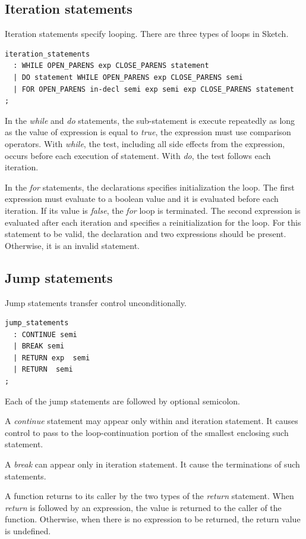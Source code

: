 \documentclass{l3proj}
\begin{document}
\subsection{Iteration statements}
Iteration statements specify looping. There are three types of loops in Sketch. 
\begin{lstlisting}
iteration_statements  
  : WHILE OPEN_PARENS exp CLOSE_PARENS statement
  | DO statement WHILE OPEN_PARENS exp CLOSE_PARENS semi
  | FOR OPEN_PARENS in-decl semi exp semi exp CLOSE_PARENS statement
;
\end{lstlisting}
In the \textit{while} and \textit{do} statements, the sub-statement is execute repeatedly as long as the value of expression is equal to \textit{true}, the expression must use comparison operators. With \textit{while}, the test, including all side effects from the expression, occurs before each execution of statement. With \textit{do}, the test follows each iteration. 

In the \textit{for} statements, the declarations specifies initialization the loop. The first expression must evaluate to a boolean value and it is evaluated before each iteration. If its value is \textit{false}, the \textit{for} loop is terminated. The second expression is evaluated after each iteration and specifies a reinitialization for the loop. For this statement to be valid, the declaration and two expressions should be present. Otherwise, it is an invalid statement. 
\subsection{Jump statements} 
Jump statements transfer control unconditionally. 
\begin{lstlisting}
jump_statements 
  : CONTINUE semi
  | BREAK semi 
  | RETURN exp  semi 
  | RETURN  semi 
;
\end{lstlisting}
Each of the jump statements are followed by optional semicolon. 

A \textit{continue} statement may appear only within and iteration statement. It causes control to pass to the loop-continuation portion of the smallest enclosing such statement.

A \textit{break} can appear only in iteration statement. It cause the terminations of such statements. 

A function returns to its caller by the two types of the \textit{return} statement. When \textit{return} is followed by an expression, the value is returned to the caller of the function. Otherwise, when there is no expression to be returned, the return value is undefined. 
\end{document}
